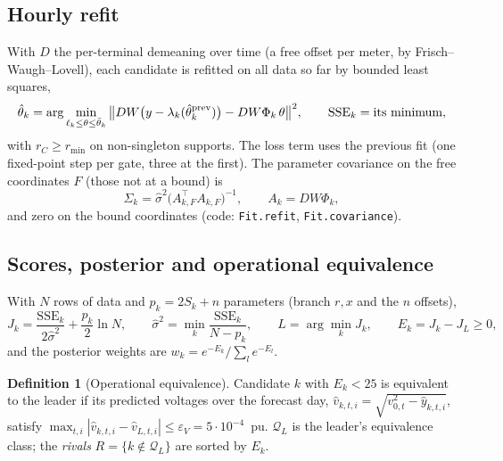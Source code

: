 \documentclass[11pt]{article}
\theoremstyle{definition}
\newtheorem{definition}{Definition}
\newcommand{\tp}{^{\top}}
\newcommand{\cQ}{\mathcal{Q}}
\newcommand{\code}[1]{\texttt{#1}}
\begin{document}
{\subsection{Hourly refit}
With $D$ the per-terminal demeaning over time (a free offset per meter, by Frisch--Waugh--Lovell), each candidate is refitted on all data so far by bounded least squares,
\begin{equation}\label{eq:refit}
  \hat\theta_k=\arg\min_{\ell_k\le\theta\le\bar\theta_k}\big\|DW\big(y-\lambda_k(\hat\theta_k^{\rm prev})\big)-DW\Phi_k\,\theta\big\|^2,
  \qquad \mathrm{SSE}_k=\text{its minimum},
\end{equation}
with $r_C\ge r_{\min}$ on non-singleton supports. The loss term uses the previous fit (one fixed-point step per gate, three at the first). The parameter covariance on the free coordinates $F$ (those not at a bound) is
\begin{equation}\label{eq:cov}
  \Sigma_k=\hat\sigma^2\big(A_{k,F}\tp A_{k,F}\big)^{-1},\qquad A_k=DW\Phi_k ,
\end{equation}
and zero on the bound coordinates (code: \code{Fit.refit}, \code{Fit.covariance}).

\subsection{Scores, posterior and operational equivalence}
With $N$ rows of data and $p_k=2S_k+n$ parameters (branch $r,x$ and the $n$ offsets),
\begin{equation}\label{eq:bic}
  J_k=\frac{\mathrm{SSE}_k}{2\hat\sigma^2}+\frac{p_k}{2}\ln N,\qquad \hat\sigma^2=\min_k\frac{\mathrm{SSE}_k}{N-p_k},
  \qquad L=\arg\min_k J_k,\qquad E_k=J_k-J_L\ge0,
\end{equation}
and the posterior weights are $w_k=e^{-E_k}\big/\sum_l e^{-E_l}$.

\begin{definition}[Operational equivalence]
Candidate $k$ with $E_k<25$ is equivalent to the leader if its predicted voltages over the forecast day, $\hat v_{k,t,i}=\sqrt{v_{0,t}^2-\hat y_{k,t,i}}$, satisfy $\max_{t,i}|\hat v_{k,t,i}-\hat v_{L,t,i}|\le\varepsilon_V=5\cdot10^{-4}$~pu. $\cQ_L$ is the leader's equivalence class; the \emph{rivals} $R=\{k\notin\cQ_L\}$ are sorted by $E_k$.
\end{definition}

}
\end{document}
